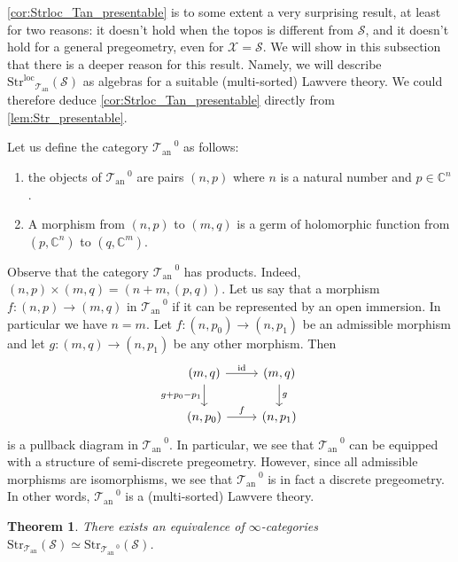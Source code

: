 \documentclass[12pt,a4paper,reqno]{amsart}
\theoremstyle{plain}
\newtheorem{thm}{Theorem}[section]
\theoremstyle{definition}
\theoremstyle{remark}
\numberwithin{equation}{section}
\begin{document}
\cref{cor:Strloc_Tan_presentable} is to some extent a very surprising result, at least for two reasons: it doesn't hold when the topos is different from ${\mathcal S}$, and it doesn't hold for a general pregeometry, even for ${\mathcal X} = {\mathcal S}$.
We will show in this subsection that there is a deeper reason for this result. Namely, we will describe ${\mathrm{Str}^\mathrm{loc}}_{{\mathcal T}_{\mathrm{an}}}({\mathcal S})$ as algebras for a suitable (multi-sorted) Lawvere theory.
We could therefore deduce \cref{cor:Strloc_Tan_presentable} directly from \cref{lem:Str_presentable}.

Let us define the category ${{{\mathcal T}_{\mathrm{an}}}^{\; \! 0}}$ as follows:
\begin{enumerate}
	\item the objects of ${{{\mathcal T}_{\mathrm{an}}}^{\; \! 0}}$ are pairs $(n, p)$ where $n$ is a natural number and $p \in \mathbb C^n$.
	\item A morphism from $(n,p)$ to $(m,q)$ is a germ of holomorphic function from $(p, \mathbb C^n)$ to $(q, \mathbb C^m)$.
\end{enumerate}

Observe that the category ${{{\mathcal T}_{\mathrm{an}}}^{\; \! 0}}$ has products. Indeed, $(n,p) \times (m,q) = (n+m, (p,q))$.
Let us say that a morphism $f \colon (n,p) \to (m,q)$ in ${{{\mathcal T}_{\mathrm{an}}}^{\; \! 0}}$ if it can be represented by an open immersion. In particular we have $n = m$.
Let $f \colon (n,p_0) \to (n,p_1)$ be an admissible morphism and let $g \colon (m,q) \to (n,p_1)$ be any other morphism.
Then
\[ \begin{tikzcd}
(m,q) \arrow{r}{\mathrm{id}} \arrow{d}[swap]{g + p_0 - p_1} & (m,q) \arrow{d}{g} \\
(n,p_0) \arrow{r}{f} & (n, p_1)
\end{tikzcd} \]
is a pullback diagram in ${{{\mathcal T}_{\mathrm{an}}}^{\; \! 0}}$.
In particular, we see that ${{{\mathcal T}_{\mathrm{an}}}^{\; \! 0}}$ can be equipped with a structure of semi-discrete pregeometry.
However, since all admissible morphisms are isomorphisms, we see that ${{{\mathcal T}_{\mathrm{an}}}^{\; \! 0}}$ is in fact a discrete pregeometry.
In other words, ${{{\mathcal T}_{\mathrm{an}}}^{\; \! 0}}$ is a (multi-sorted) Lawvere theory.

\begin{thm} \label{thm:Strloc_Tan_S_Lawvere}
	There exists an equivalence of $\infty$-categories ${\mathrm{Str}}_{{\mathcal T}_{\mathrm{an}}}({\mathcal S}) \simeq {\mathrm{Str}}_{{{\mathcal T}_{\mathrm{an}}}^{\; \! 0}}({\mathcal S})$.
\end{thm}
\end{document}

